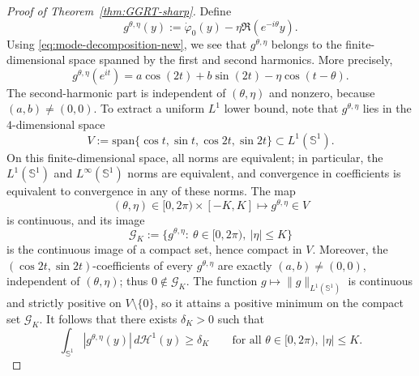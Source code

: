 \documentclass[a4paper,11pt,reqno]{amsart}
\numberwithin{equation}{section}
\theoremstyle{plain} %
\theoremstyle{definition} %
\theoremstyle{remark}
\begin{document}
\begin{proof}[Proof of Theorem~\ref{thm:GGRT-sharp}]
Define
\[
g^{\theta,\eta}(y)
:=
\dot\varphi_0(y)-\eta \Re(e^{-i\theta}y).
\]
Using \eqref{eq:mode-decomposition-new}, we see that $g^{\theta,\eta}$ belongs
to the finite-dimensional space spanned by the first and second harmonics.
More precisely,
\[
g^{\theta,\eta}(e^{it})
=
a\cos(2t)+b\sin(2t)-\eta \cos(t-\theta).
\]
The second-harmonic part is independent of $(\theta,\eta)$ and nonzero, because
$(a,b)\neq (0,0)$. To extract a uniform \(L^1\) lower bound, note that
\(g^{\theta,\eta}\) lies in the \(4\)-dimensional space
\[
V:=\mathrm{span}\bigl\{\cos t,\sin t,\cos 2t,\sin 2t\bigr\}\subset L^1(\mathbb S^1).
\]
On this finite-dimensional space, all norms are equivalent; in particular, the
\(L^1(\mathbb S^1)\) and \(L^\infty(\mathbb S^1)\) norms are equivalent, and
convergence in coefficients is equivalent to convergence in any of these norms. The map
\[
(\theta,\eta)\in [0,2\pi)\times [-K,K]\longmapsto g^{\theta,\eta}\in V
\]
is continuous, and its image
\[
\mathcal G_K:=\{g^{\theta,\eta}:\ \theta\in[0,2\pi),\ |\eta|\leq K\}
\]
is the continuous image of a compact set, hence compact in \(V\). Moreover, the
\((\cos 2t,\sin 2t)\)-coefficients of every \(g^{\theta,\eta}\) are exactly
\((a,b)\neq (0,0)\), independent of \((\theta,\eta)\); thus \(0\notin
\mathcal G_K\). The function \(g\mapsto\|g\|_{L^1(\mathbb S^1)}\) is continuous
and strictly positive on \(V\setminus\{0\}\), so it attains a positive minimum
on the compact set \(\mathcal G_K\). It follows that there exists
$\delta_K>0$ such that
\begin{equation}\label{eq:uniform-l1-lower-new}
\int_{\mathbb S^1}|g^{\theta,\eta}(y)|\,d\mathcal H^1(y)\geq \delta_K
\qquad
\text{for all }\theta\in[0,2\pi),\ |\eta|\leq K.
\end{equation}


\end{proof}
\end{document}
